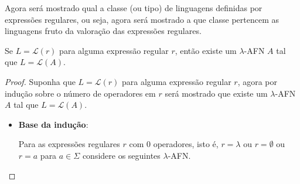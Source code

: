 Agora será mostrado qual a classe (ou tipo) de linguagens definidas por expressões regulares, ou seja, agora será mostrado a que classe pertencem as linguagens fruto da valoração das expressões regulares.

\begin{theorem}\label{teo:Exp-AFN}
	Se $L = \mathcal{L}(r)$ para alguma expressão regular $r$, então existe um $\lambda$-AFN $A$ tal que $L = \mathcal{L}(A)$.
\end{theorem}

\begin{proof}
	Suponha que $L = \mathcal{L}(r)$ para alguma expressão regular $r$, agora por indução sobre o número de operadores em $r$ será mostrado que existe um $\lambda$-AFN $A$ tal que $L = \mathcal{L}(A)$.
	
	\begin{itemize}
		\item \textbf{Base da indução}:
		
		Para as expressões regulares $r$ com $0$ operadores, isto é, $r = \lambda$ ou $r = \emptyset$ ou $r = a$ para $a \in \Sigma$ considere os seguintes $\lambda$-AFN.
		
		\begin{figure}[h]
			\centering
			\quad\quad\quad
			\quad\quad\quad
\end{figure}
\end{itemize}
\end{proof}
